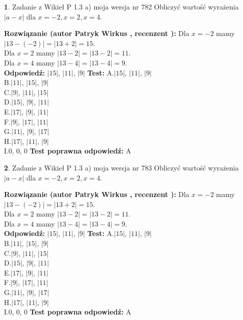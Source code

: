 \documentclass[12pt, a4paper]{article}
\theoremstyle{definition} %
\newtheorem{zad}{}
\newcommand{\zadStart}[1]{\begin{zad}#1\newline}
\newcommand{\zadStop}{\end{zad}}
\newcommand{\rozwStart}[2]{\noindent \textbf{Rozwiązanie (autor #1 , recenzent #2): }\newline}
\newcommand{\rozwStop}{\newline}
\newcommand{\odpStart}{\noindent \textbf{Odpowiedź:}\newline}
\newcommand{\odpStop}{\newline}
\newcommand{\testStart}{\noindent \textbf{Test:}\newline}
\newcommand{\testStop}{\newline}
\newcommand{\kluczStart}{\noindent \textbf{Test poprawna odpowiedź:}\newline}
\newcommand{\kluczStop}{\newline}
\begin{document}
\zadStart{Zadanie z Wikieł P 1.3 a) moja wersja nr 782}
Obliczyć wartość wyrażenia $|a - x|$ dla $x=-2,x=2,x=4$.
\zadStop
\rozwStart{Patryk Wirkus}{}
Dla $x = -2$ mamy $|13 - (-2)| = |13 + 2| = 15$.\\
Dla $x = 2$ mamy $|13 - 2| = |13 - 2| = 11$.\\
Dla $x = 4$ mamy $|13 - 4| = |13 - 4| = 9$.\\
\rozwStop
\odpStart
$|15|$, $|11|$, $|9|$
\odpStop
\testStart
A.$|15|$, $|11|$, $|9|$\\
B.$|11|$, $|15|$, $|9|$\\
C.$|9|$, $|11|$, $|15|$\\
D.$|15|$, $|9|$, $|11|$\\
E.$|17|$, $|9|$, $|11|$\\
F.$|9|$, $|17|$, $|11|$\\
G.$|11|$, $|9|$, $|17|$\\
H.$|17|$, $|11|$, $|9|$\\
I.$0$, $0$, $0$
\testStop
\kluczStart
A
\kluczStop



\zadStart{Zadanie z Wikieł P 1.3 a) moja wersja nr 783}
Obliczyć wartość wyrażenia $|a - x|$ dla $x=-2,x=2,x=4$.
\zadStop
\rozwStart{Patryk Wirkus}{}
Dla $x = -2$ mamy $|13 - (-2)| = |13 + 2| = 15$.\\
Dla $x = 2$ mamy $|13 - 2| = |13 - 2| = 11$.\\
Dla $x = 4$ mamy $|13 - 4| = |13 - 4| = 9$.\\
\rozwStop
\odpStart
$|15|$, $|11|$, $|9|$
\odpStop
\testStart
A.$|15|$, $|11|$, $|9|$\\
B.$|11|$, $|15|$, $|9|$\\
C.$|9|$, $|11|$, $|15|$\\
D.$|15|$, $|9|$, $|11|$\\
E.$|17|$, $|9|$, $|11|$\\
F.$|9|$, $|17|$, $|11|$\\
G.$|11|$, $|9|$, $|17|$\\
H.$|17|$, $|11|$, $|9|$\\
I.$0$, $0$, $0$
\testStop
\kluczStart
A
\kluczStop
\end{document}
